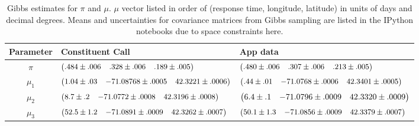 \documentclass[twoside]{article}
\theoremstyle{theorem}
\theoremstyle{theorem}
\theoremstyle{theorem}
\theoremstyle{lemma}
\theoremstyle{definition}
\theoremstyle{example}
\begin{document}
\begin{table}
\label{comparison}
\begin{center}
\begin{tabularx}{\textwidth}{c| l | l}
Parameter & Constituent Call & App data\\[5pt]
\hline
$\pi$ &
$\small\left(\begin{array}{@{} ccc@{} } .484\pm.006 & .328\pm.006  &.189\pm.005 \end{array}\right)$ 
&
$\small\left(\begin{array}{@{} ccc@{} } .480\pm.006 & .307\pm.006  &.213\pm.005 \end{array}\right)$\\[5pt] 
$\mu_1 $ &       
 $\small\left(\begin{array}{@{} ccc@{} } 1.04\pm.03 & -71.08768\pm .0005  &42.3221 \pm .0006 \end{array}\right)$   
&
$\small\left(\begin{array}{@{} ccc@{} } .44\pm.01 & -71.0768\pm .0006  &42.3401\pm .0005 \end{array}\right)$
\\[5pt]
$\mu_2 $        &
$\small\left(\begin{array}{@{} ccc@{} } 8.7\pm.2 & -71.0772\pm.0008  &42.3196\pm .0008 \end{array}\right)$  
&
$\left(\begin{array}{@{} ccc@{} } 6.4\pm.1 & -71.0796\pm.0009  &42.3320\pm .0009 \end{array}\right)$
\\[5pt]
$\mu_3$ &
$\small\left(\begin{array}{@{} ccc@{} } 52.5\pm1.2 & -71.0891\pm .0009  &42.3262\pm .0007 \end{array}\right)$

&
$\small\left(\begin{array}{@{} ccc@{} } 50.1\pm1.3 & -71.0856\pm .0009  &42.3379\pm .0007 \end{array}\right)$
 \\
\end{tabularx}
\vspace{1pt}
\caption{Gibbs estimates for $\pi$ and $\mu$. $\mu$ vector listed in order of (response time, longitude, latitude) in units of days and decimal degrees. Means and uncertainties for covariance matrices from Gibbs sampling are listed in the IPython notebooks due to space constraints here.}
\end{center}
\end{table}
\end{document}
